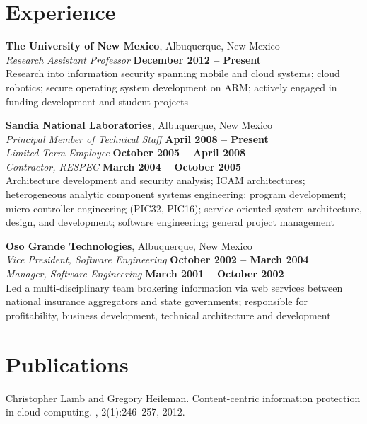 \documentclass[margin,line]{resume}
\begin{document}
\begin{resume}
\section{\mysidestyle Experience}
{\bf The University of New Mexico}, Albuquerque, New Mexico \vspace{2mm} \\\vspace{1mm}%
{\sl Research Assistant Professor} \hfill \textbf{December 2012 -- Present} \\
Research into information security spanning mobile and cloud systems; cloud robotics; secure operating system development on ARM; actively engaged in funding development and student projects


{\bf Sandia National Laboratories}, Albuquerque, New Mexico \vspace{2mm} \\
{\sl Principal Member of Technical Staff} \hfill \textbf{April 2008 -- Present} \\
{\sl Limited Term Employee} \hfill \textbf{October 2005 -- April 2008} \\\vspace{1mm}%
{\sl Contractor, RESPEC} \hfill \textbf{March 2004 -- October 2005} \\
Architecture development and security analysis; ICAM architectures; heterogeneous analytic component systems engineering; program development; micro-controller engineering (PIC32, PIC16); service-oriented system architecture, design, and development; software engineering; general project management 

{\bf Oso Grande Technologies}, Albuquerque, New Mexico \vspace{2mm} \\
{\sl Vice President, Software Engineering} \hfill \textbf{October 2002 -- March 2004} \\\vspace{1mm}%
{\sl Manager, Software Engineering} \hfill \textbf{March 2001 -- October 2002} \\
Led a multi-disciplinary team brokering information via web services between national insurance aggregators and state governments; responsible for profitability, business development, technical architecture and development

\section{\mysidestyle Publications}
Christopher Lamb and Gregory Heileman.
\newblock Content-centric information protection in cloud computing.
,
  2(1):246--257, 2012.


\end{resume}
\end{document}
